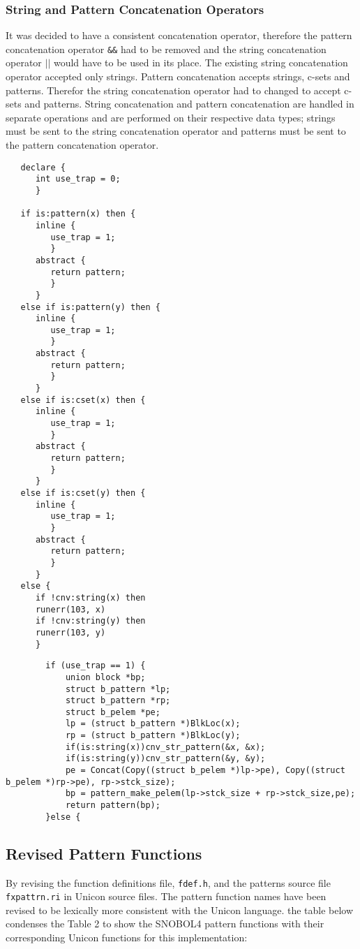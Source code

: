 \documentclass{article}
\begin{document}
\subsubsection{String and Pattern Concatenation Operators}
It was decided to have a consistent concatenation operator, therefore the pattern concatenation operator \texttt{\&\&} had to be removed and the string concatenation operator $\vert\vert$ would have to be used in its place.  The existing string concatenation operator accepted only strings.  Pattern concatenation accepts strings, c-sets and patterns.  Therefor the string concatenation operator had to changed to accept c-sets and patterns.  String concatenation and pattern concatenation are handled in separate operations and are performed on their respective data types; strings must be sent to the string concatenation operator and patterns must be sent to the pattern concatenation operator. 
\begin{verbatim}
   declare {
      int use_trap = 0;
      }

   if is:pattern(x) then {
      inline {
         use_trap = 1;
         }
      abstract {
         return pattern;
         }
      }
   else if is:pattern(y) then {
      inline {
         use_trap = 1;
         }
      abstract {
         return pattern;
         }
      }
   else if is:cset(x) then {
      inline {
         use_trap = 1;
         }
      abstract {
         return pattern;
         }
      }
   else if is:cset(y) then {
      inline {
         use_trap = 1;
         }
      abstract {
         return pattern;
         }
      }
   else {
      if !cnv:string(x) then
      runerr(103, x)
      if !cnv:string(y) then
      runerr(103, y)
      }
\end{verbatim}

\begin{verbatim}
		if (use_trap == 1) {	
			union block *bp;
			struct b_pattern *lp;
			struct b_pattern *rp;
			struct b_pelem *pe;
			lp = (struct b_pattern *)BlkLoc(x);
			rp = (struct b_pattern *)BlkLoc(y);
			if(is:string(x))cnv_str_pattern(&x, &x);
			if(is:string(y))cnv_str_pattern(&y, &y);
			pe = Concat(Copy((struct b_pelem *)lp->pe), Copy((struct b_pelem *)rp->pe), rp->stck_size);
			bp = pattern_make_pelem(lp->stck_size + rp->stck_size,pe);
			return pattern(bp);
		}else {
\end{verbatim}

\subsection{Revised Pattern Functions}
By revising the function definitions file, \texttt{fdef.h}, and the patterns source file \texttt{fxpattrn.ri} in Unicon source files.  The pattern function names have been revised to be lexically more consistent with the Unicon language.  the table below condenses the Table 2 to show the SNOBOL4 pattern functions with their corresponding Unicon functions for this implementation:  
\end{document}
